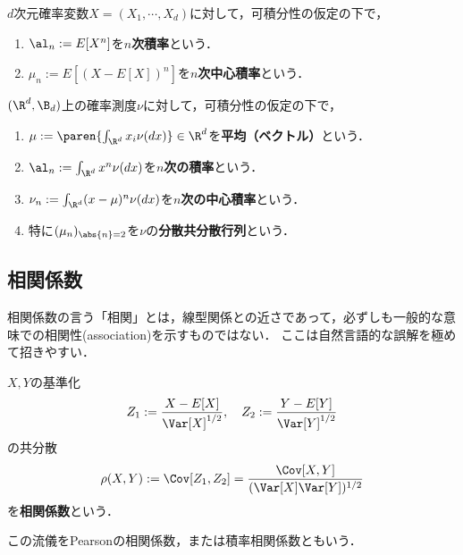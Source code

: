 \documentclass[uplatex,dvipdfmx]{jsreport}
\begin{document}
\begin{definition}
    $d$次元確率変数$X=(X_1,\cdots,X_d)$に対して，可積分性の仮定の下で，
    \begin{enumerate}
        \item $\al_n:=E[X^n]$を\textbf{$n$次積率}という．
        \item $\mu_n:=E[(X-E[X])^n]$を\textbf{$n$次中心積率}という．
    \end{enumerate}
\end{definition}

\begin{definition}
    $(\R^d,\B_d)$上の確率測度$\nu$に対して，可積分性の仮定の下で，
    \begin{enumerate}
        \item $\mu:=\paren{\int_{\R^d}x_i\nu(dx)}\in\R^d$を\textbf{平均（ベクトル）}という．
        \item $\al_n:=\int_{\R^d}x^n\nu(dx)$を\textbf{$n$次の積率}という．
        \item $\nu_n:=\int_{\R^d}(x-\mu)^n\nu(dx)$を\textbf{$n$次の中心積率}という．
        \item 特に$(\mu_n)_{\abs{n}=2}$を$\nu$の\textbf{分散共分散行列}という．
    \end{enumerate}
\end{definition}

\subsection{相関係数}

\begin{tcolorbox}[colframe=ForestGreen, colback=ForestGreen!10!white,breakable,colbacktitle=ForestGreen!40!white,coltitle=black,fonttitle=\bfseries\sffamily,
    title=]
    相関係数の言う「相関」とは，線型関係との近さであって，必ずしも一般的な意味での相関性(association)を示すものではない．
    ここは自然言語的な誤解を極めて招きやすい．
\end{tcolorbox}

\begin{definition}
    $X,Y$の基準化
    \[Z_1:=\frac{X-E[X]}{\Var[X]^{1/2}},\quad Z_2:=\frac{Y-E[Y]}{\Var[Y]^{1/2}}\]
    の共分散
    \[\rho(X,Y):=\Cov[Z_1,Z_2]=\frac{\Cov[X,Y]}{(\Var[X]\Var[Y])^{1/2}}\]
    を\textbf{相関係数}という．
\end{definition}
\begin{history}
    この流儀をPearsonの相関係数，または積率相関係数ともいう．
\end{history}
\end{document}
